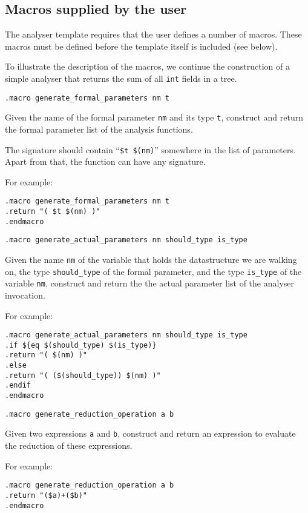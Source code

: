\subsection{Macros supplied by the user}
The analyser template requires that the user defines a number of macros.
These macros must be defined before the template itself is included
(see below).
\par
To illustrate the description of the macros, we continue the
construction of a simple analyser
that returns the sum of all \texttt{int} fields in a tree.
\begin{verbatim}
.macro generate_formal_parameters nm t
\end{verbatim}
\begin{desc}
Given the name of the formal parameter \texttt{nm} and its type \texttt{t},
construct and return the formal parameter list of the analysis functions.

The signature should contain ``\verb'$t $(nm)''' somewhere in the list
of parameters. Apart from that, the function can have any signature.
\par
For example:
\begin{verbatim}
.macro generate_formal_parameters nm t
.return "( $t $(nm) )"
.endmacro
\end{verbatim}
\end{desc}
\begin{verbatim}
.macro generate_actual_parameters nm should_type is_type
\end{verbatim}
\begin{desc}
Given the name \verb'nm' of the variable that holds the datastructure
we are walking on, the type \verb'should_type' of the formal parameter,
and the type \verb'is_type' of the variable \texttt{nm}, construct and
return the the actual parameter list of the analyser invocation.
\par
For example:
\begin{verbatim}
.macro generate_actual_parameters nm should_type is_type
.if ${eq $(should_type) $(is_type)}
.return "( $(nm) )"
.else
.return "( ($(should_type)) $(nm) )"
.endif
.endmacro
\end{verbatim}
\end{desc}
\begin{verbatim}
.macro generate_reduction_operation a b
\end{verbatim}
\begin{desc}
Given two expressions \texttt{a} and \texttt{b}, construct and return an expression
to evaluate the reduction of these expressions.
\par
For example:
\begin{verbatim}
.macro generate_reduction_operation a b
.return "($a)+($b)"
.endmacro
\end{verbatim}
\end{desc}
